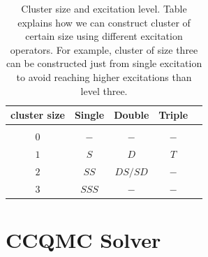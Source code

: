 \documentclass[twoside,english]{uiofysmaster}
\begin{document}
\begin{table}[h!]
	\caption{ Cluster size and excitation level. Table explains how we can construct cluster of certain size using different excitation operators. For example, cluster of size three can be constructed just from single excitation to avoid reaching higher excitations than level three. }
	\label{tab:cpluster}
	\begin{center}
		\begin{tabular}{ccccc}
			
			\hline
			cluster size & Single & Double & Triple  \\
			\hline\\
			$ 0 $ & $-$ & $-$ & $-$ &   \\
			$ 1 $ & $S$ & $D$ & $T$ &   \\
			$ 2 $ & $SS$ & $DS/SD $ & $-$ &   \\
			$ 3 $ & $SSS$ & $-$ & $-$ &   \\
		\end{tabular}
	\end{center}
\end{table}

\section{CCQMC Solver}
\end{document}
